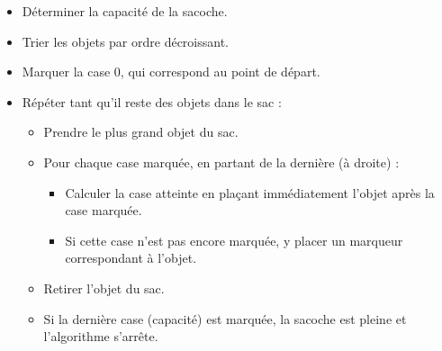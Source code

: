 \begin{itemize}
\item Déterminer la capacité de la sacoche.
\item Trier les objets par ordre décroissant.
\item Marquer la case 0, qui correspond au point de départ.
\item Répéter tant qu'il reste des objets dans le sac :
  \begin{itemize}
  \item Prendre le plus grand objet du sac.
  \item Pour chaque case marquée, en partant de la dernière (à droite) :
    \begin{itemize}
    \item Calculer la case atteinte en plaçant immédiatement l’objet après la case marquée.
    \item Si cette case n’est pas encore marquée, y placer un marqueur correspondant à l’objet.
    \end{itemize}
  \item Retirer l’objet du sac.
  \item Si la dernière case (capacité) est marquée, la sacoche est pleine et l’algorithme s’arrête.
  \end{itemize}
\end{itemize}
